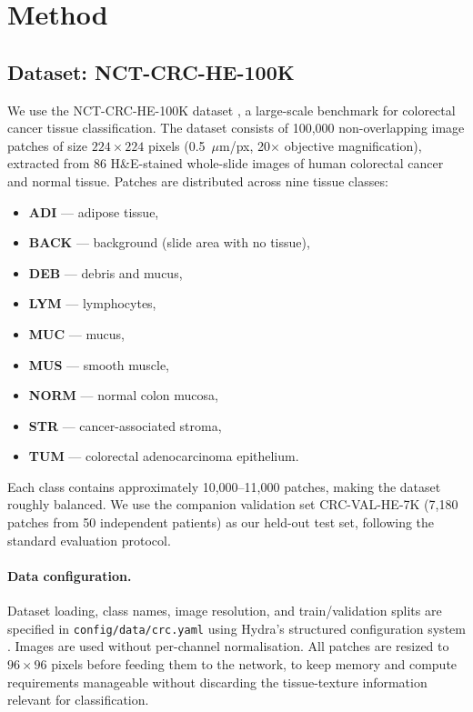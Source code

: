 \section{Method}
\label{sec:method}

\subsection{Dataset: NCT-CRC-HE-100K}

We use the NCT-CRC-HE-100K dataset \citep{kather2018100}, a large-scale
benchmark for colorectal cancer tissue classification. The dataset consists of
100,000 non-overlapping image patches of size \(224 \times 224\) pixels (0.5~\(\mu\)m/px,
20\(\times\) objective magnification), extracted from 86 H\&E-stained whole-slide images of
human colorectal cancer and normal tissue. Patches are distributed across nine
tissue classes:
\begin{itemize}
  \item \textbf{ADI} --- adipose tissue,
  \item \textbf{BACK} --- background (slide area with no tissue),
  \item \textbf{DEB} --- debris and mucus,
  \item \textbf{LYM} --- lymphocytes,
  \item \textbf{MUC} --- mucus,
  \item \textbf{MUS} --- smooth muscle,
  \item \textbf{NORM} --- normal colon mucosa,
  \item \textbf{STR} --- cancer-associated stroma,
  \item \textbf{TUM} --- colorectal adenocarcinoma epithelium.
\end{itemize}
Each class contains approximately 10,000--11,000 patches, making the dataset
roughly balanced. We use the companion validation set CRC-VAL-HE-7K (7,180 patches
from 50 independent patients) as our held-out test set, following the standard
evaluation protocol.

\paragraph{Data configuration.}
Dataset loading, class names, image resolution, and train/validation splits are
specified in \texttt{config/data/crc.yaml} using Hydra's structured configuration
system \citep{yadan2019hydra}. Images are used without per-channel normalisation.
All patches are resized to \(96 \times 96\) pixels before feeding them to the network,
to keep memory and compute requirements manageable without discarding the
tissue-texture information relevant for classification.

